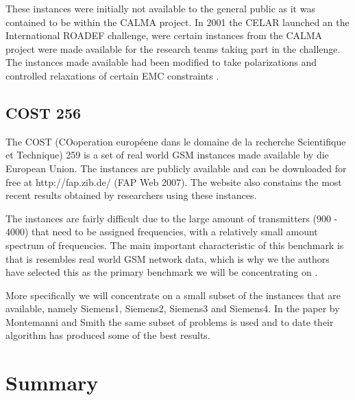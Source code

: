 These instances were initially not available to the general public as it was contained to be within the CALMA project. In 2001 the CELAR launched an the International ROADEF challenge, were certain instances from the CALMA project were made available for the research teams taking part in the challenge. The instances made available had been modified to take polarizations and controlled relaxations of certain EMC constraints \cite{LowerPolarFAP}.
\subsection{COST 256}
The COST (COoperation européene dans le domaine de la recherche Scientifique et Technique) 259 is a set of real world GSM instances made available by die European Union. The instances are publicly available and can  be downloaded for free at http://fap.zib.de/ (FAP Web 2007). The website also constains the most recent results obtained by researchers using these instances\cite{Karen2004,Eisenblatter}.

The instances are fairly difficult due to the large amount of transmitters (900 - 4000) that need to be assigned frequencies, with a relatively small amount spectrum of frequencies. The main important characteristic of this benchmark is that is resembles real world GSM network data, which is why we the authors have selected this as the primary benchmark we will be concentrating on \cite{Karen2004,FAPWeb}.

More specifically we will concentrate on a small subset of the instances that are available, namely Siemens1, Siemens2, Siemens3 and Siemens4. In the paper by Montemanni and Smith \cite{TabuMontemanniSmith} the same subset of problems is used and to date their algorithm has produced some of the best results. %
\section{Summary}
